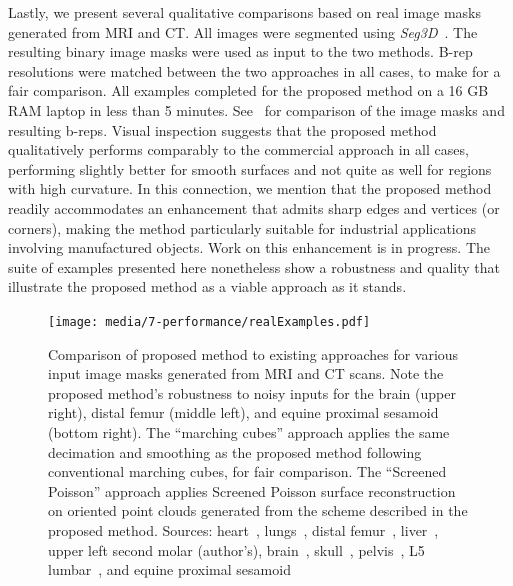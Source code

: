 Lastly, we present several qualitative comparisons based on real image masks generated from MRI and CT.  All images were segmented using \textit{Seg3D}~\cite{Seg3D}. The resulting binary image masks were used as input to the two methods. B-rep resolutions were matched between the two approaches in all cases, to make for a fair comparison. All examples completed for the proposed method on a 16 GB RAM laptop in less than 5 minutes. See~ for comparison of the image masks and resulting b-reps. Visual inspection suggests that the proposed method qualitatively performs comparably to the commercial approach in all cases, performing slightly better for smooth surfaces and not quite as well for regions with high curvature.  In this connection, we mention that the proposed method readily accommodates an enhancement that admits sharp edges and vertices (or corners), making the method particularly suitable for industrial applications involving manufactured objects.  Work on this enhancement is in progress.  The suite of examples presented here nonetheless show a robustness and quality that illustrate the proposed method as a viable approach as it stands.
\begin{figure}[h!]
	\centering
	\texttt{[image: media/7-performance/realExamples.pdf]}
	\caption{Comparison of proposed method to existing approaches for various input image masks generated from MRI and CT scans. Note the proposed method's robustness to noisy inputs for the brain (upper right), distal femur (middle left), and equine proximal sesamoid (bottom right). The ``marching cubes'' approach applies the same decimation and smoothing as the proposed method following conventional marching cubes, for fair comparison. The ``Screened Poisson'' approach applies Screened Poisson surface reconstruction on oriented point clouds generated from the scheme described in the proposed method. Sources: heart~\cite{cvgg}, lungs~\cite{rikxoort_2009}, distal femur~\cite{epperson_2013}, liver~\cite{bilic_2019}, upper left second molar (author's), brain~\cite{marcus_2007}, skull~\cite{clark_2013}, pelvis~\cite{clark_2013}, L5 lumbar~\cite{yao_2016}, and equine proximal sesamoid~\cite{shaffer2021}}
	\label{fig:example-meshes}
\end{figure}